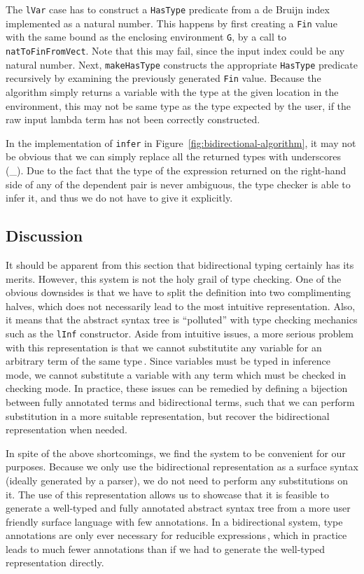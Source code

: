 The \texttt{lVar} case has to construct a \texttt{HasType} predicate from a de Bruijn index implemented as a natural number. This happens by first creating a \texttt{Fin} value with the same bound as the enclosing environment \texttt{G}, by a call to \texttt{natToFinFromVect}. Note that this may fail, since the input index could be any natural number. Next, \texttt{makeHasType} constructs the appropriate \texttt{HasType} predicate recursively by examining the previously generated \texttt{Fin} value. Because the algorithm simply returns a variable with the type at the given location in the environment, this may not be same type as the type expected by the user, if the raw input lambda term has not been correctly constructed.

In the implementation of \texttt{infer} in Figure~\ref{fig:bidirectional-algorithm}, it may not be obvious that we can simply replace all the returned types with underscores (\_). Due to the fact that the type of the expression returned on the right-hand side of any of the dependent pair is never ambiguous, the type checker is able to infer it, and thus we do not have to give it explicitly. 

\subsection{Discussion}
It should be apparent from this section that bidirectional typing certainly has its merits. However, this system is not the holy grail of type checking. One of the obvious downsides is that we have to split the definition into two complimenting halves, which does not necessarily lead to the most intuitive representation. Also, it means that the abstract syntax tree is ``polluted'' with type checking mechanics such as the \texttt{lInf} constructor. Aside from intuitive issues, a more serious problem with this representation is that we cannot substitutite any variable for an arbitrary term of the same type\,\cite{Weirich:bidirectional}. Since variables must be typed in inference mode, we cannot substitute a variable with any term which must be checked in checking mode. In practice, these issues can be remedied by defining a bijection between fully annotated terms and bidirectional terms, such that we can perform substitution in a more suitable representation, but recover the bidirectional representation when needed.

In spite of the above shortcomings, we find the system to be convenient for our purposes. Because we only use the bidirectional representation as a surface syntax (ideally generated by a parser), we do not need to perform any substitutions on it. The use of this representation allows us to showcase that it is feasible to generate a well-typed and fully annotated abstract syntax tree from a more user friendly surface language with few annotations. In a bidirectional system, type annotations are only ever necessary for reducible expressions\,\cite{Dunfield13:bidir}, which in practice leads to much fewer annotations than if we had to generate the well-typed representation directly.

